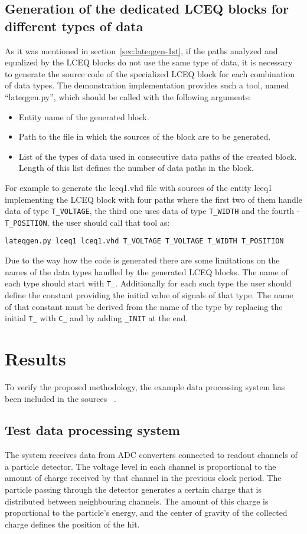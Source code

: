 \documentclass[preprint,11pt]{elsarticle}
\newcommand{\wzcite}[1]{ \cite{#1}}
\begin{document}
\subsection{Generation of the dedicated LCEQ blocks for different types of data}
\label{sec:lceq-generation}
As it was mentioned in section~\ref{sec:lateqgen-1st}, if the paths analyzed and equalized by the LCEQ blocks do not use the same type of data, it is necessary to generate the source code of the specialized LCEQ block for each combination of
data types.
The demonstration implementation provides such a tool, named ``lateqgen.py'', which
 should be called with the following arguments:
\begin{itemize}
 \item Entity name of the generated block.
 \item Path to the file in which the sources of the block are to be generated.
 \item List of the types of data used in consecutive data paths of the created block. Length of this list defines the number of data paths in the block.
\end{itemize}
For example to generate the lceq1.vhd file with sources of the entity lceq1 
implementing the LCEQ block with four paths where the first two of them handle 
data of type \verb|T_VOLTAGE|, the third one uses data of type \verb|T_WIDTH| and the fourth - \verb|T_POSITION|, the user should call that tool as:

\verb|lateqgen.py lceq1 lceq1.vhd T_VOLTAGE T_VOLTAGE T_WIDTH T_POSITION|	
	
Due to the way how the code is generated there are some limitations on the names 
of the data types handled by the generated LCEQ blocks.
The name of each type should start with \verb|T_|. Additionally for each such type 
the user should define the constant providing the initial value of signals
of that type. The name of that constant must be derived from the name of the type
by replacing the initial \verb|T_| with \verb|C_| and by adding \verb|_INIT| at the end.

	
\section{Results}
\label{sec:example-system}
To verify the proposed methodology, the example 
data processing system has been included in the sources~\wzcite{url-opencores-lateq}.
\subsection{Test data processing system}
The system receives data from ADC converters connected to  readout channels 
of a particle detector. The voltage level in each channel is proportional
to the amount of charge received by that channel in the previous clock period.
The particle passing through the detector generates a certain charge that is distributed
between neighbouring channels. The amount of this charge is proportional to the particle's energy, and the center of gravity of the collected charge defines the position of the hit.
\end{document}
